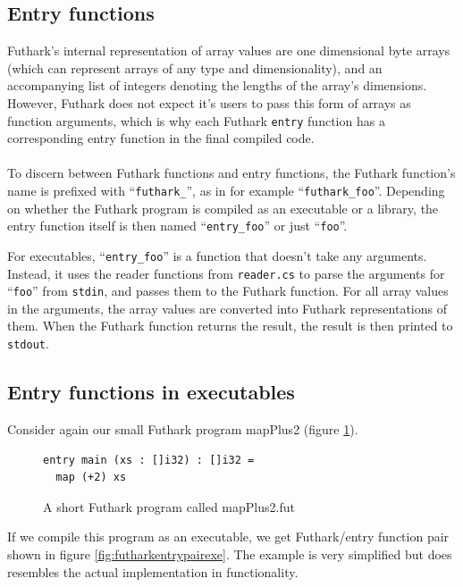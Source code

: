 \subsection{Entry functions}
\label{csharpentries}
Futhark's internal representation of array values are one dimensional byte
arrays (which can represent arrays of any type and dimensionality), and an
accompanying list of integers denoting the lengths of the array's dimensions.
However, Futhark does not expect it's users to pass this form of arrays as
function arguments, which is why each Futhark \texttt{entry} function has a
corresponding entry function in the final compiled code.
\\\\
To discern between Futhark functions and entry functions, the Futhark function's
name is prefixed with ``\texttt{futhark\_}'', as in for example
``\texttt{futhark\_foo}''.
Depending on whether the Futhark program is compiled as an executable or a
library, the entry function itself is then named ``\texttt{entry\_foo}'' or
just ``\texttt{foo}''.

For executables, ``\texttt{entry\_foo}'' is a function that doesn't take any
arguments. Instead, it uses the reader functions from \texttt{reader.cs} to parse the
arguments for ``\texttt{foo}'' from \texttt{stdin}, and passes them to the
Futhark function. For all array values in the arguments, the array values are
converted into Futhark representations of them.
When the Futhark function returns the result, the result is then printed to \texttt{stdout}.

\subsection{Entry functions in executables}
\label{entryfunctionsinexecutables}
Consider again our small Futhark program mapPlus2 (figure \ref{fig:mapplus20}).
\begin{figure}[H]
  \centering
  \begin{lstlisting}[language=Futhark]
entry main (xs : []i32) : []i32 =
  map (+2) xs
  \end{lstlisting}
  \caption{A short Futhark program called mapPlus2.fut}
  \label{fig:mapplus20}
\end{figure}

If we compile this program as an executable, we get Futhark/entry function pair
shown in figure \ref{fig:futharkentrypairexe}. The example is very simplified
but does resembles the actual implementation in functionality.

